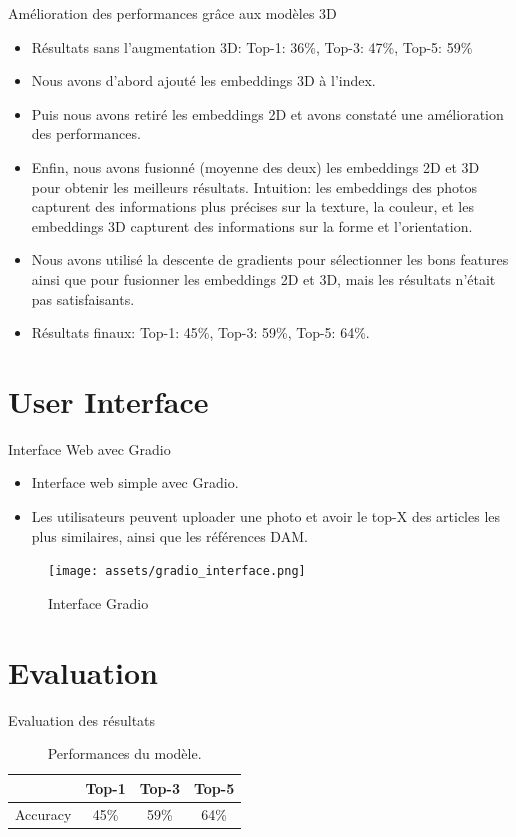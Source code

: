 \documentclass{beamer}
\begin{document}
\begin{frame}{Amélioration des performances grâce aux modèles 3D}
    \begin{itemize}
        \item Résultats sans l'augmentation 3D: Top-1: 36\%, Top-3: 47\%, Top-5: 59\%
        \item Nous avons d'abord ajouté les embeddings 3D à l'index.
        \item Puis nous avons retiré les embeddings 2D et avons constaté une amélioration des performances.
        \item Enfin, nous avons fusionné (moyenne des deux) les embeddings 2D et 3D pour obtenir les meilleurs résultats. Intuition: les embeddings des photos capturent des informations plus précises sur la texture, la couleur, et les embeddings 3D capturent des informations sur la forme et l'orientation.
        \item Nous avons utilisé la descente de gradients pour sélectionner les bons features ainsi que pour fusionner les embeddings 2D et 3D, mais les résultats n'était pas satisfaisants.
        \item Résultats finaux: Top-1: 45\%, Top-3: 59\%, Top-5: 64\%.
    \end{itemize}
\end{frame}

\section{User Interface}
\begin{frame}{Interface Web avec Gradio}
\begin{itemize}
    \item Interface web simple avec Gradio.
    \item Les utilisateurs peuvent uploader une photo et avoir le top-X des articles les plus similaires, ainsi que les références DAM.
\end{itemize}
\begin{figure}
    \centering
    \texttt{[image: assets/gradio\_interface.png]}
    \caption{Interface Gradio}
\end{figure}
\end{frame}

\section{Evaluation}
\begin{frame}{Evaluation des résultats}
\begin{table}[]
    \centering
    \begin{tabular}{|c|c|c|c|}
    \hline
    \textbf{} & \textbf{Top-1} & \textbf{Top-3} & \textbf{Top-5} \\
    \hline
    Accuracy & 45\% & 59\% & 64\% \\
    \hline
    \end{tabular}
    \caption{Performances du modèle.}
\end{table}
\end{frame}
\end{document}
